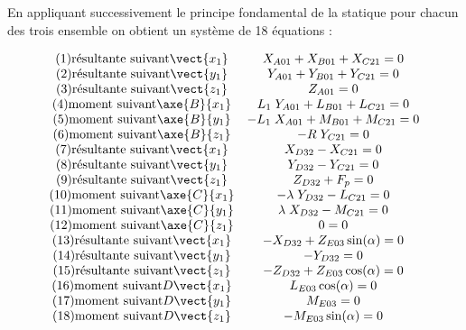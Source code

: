 En appliquant successivement le principe fondamental de la statique pour chacun des trois ensemble on obtient un système de 18 équations :

\begin{align*}
\begin{array}{c}
(1) \mbox{résultante suivant} \vect{x_1} \\ 
(2) \mbox{résultante suivant} \vect{y_1} \\ 
(3) \mbox{résultante suivant} \vect{z_1} \\ 
(4) \mbox{moment suivant} \axe{B}{{x_1}} \\ 
(5) \mbox{moment suivant} \axe{B}{{y_1}} \\ 
(6) \mbox{moment suivant} \axe{B}{{z_1}} \\ 
(7) \mbox{résultante suivant} \vect{x_1} \\ 
(8) \mbox{résultante suivant} \vect{y_1} \\ 
(9) \mbox{résultante suivant} \vect{z_1} \\ 
(10) \mbox{moment suivant} \axe{C}{{x_1}} \\ 
(11) \mbox{moment suivant} \axe{C}{{y_1}} \\ 
(12) \mbox{moment suivant} \axe{C}{{z_1}} \\ 
(13) \mbox{résultante suivant} \vect{x_1} \\ 
(14) \mbox{résultante suivant} \vect{y_1} \\ 
(15) \mbox{résultante suivant} \vect{z_1} \\ 
(16) \mbox{moment suivant} {D}{\vect{x_1}} \\ 
(17) \mbox{moment suivant} {D}{\vect{y_1}} \\ 
(18) \mbox{moment suivant} {D}{\vect{z_1}} \\ 
\end{array}
\begin{array}{c}
X_{A01}+X_{B01}+X_{C21}=0 \\
Y_{A01}+Y_{B01}+Y_{C21}=0 \\ 
Z_{A01}=0 \\ 
L_1\;Y_{A01}+L_{B01}+L_{C21}=0 \\ 
-L_1\;X_{A01}+M_{B01}+M_{C21}=0 \\  
-R\;Y_{C21} =0\\
X_{D32}-X_{C21}=0 \\ 
Y_{D32}-Y_{C21}=0 \\  
Z_{D32}+F_p=0 \\ 
-\lambda\;Y_{D32}-L_{C21}=0 \\ 
\lambda\;X_{D32}-M_{C21}=0 \\ 
0 =0\\
-X_{D32}+Z_{E03}\sin(\alpha)=0 \\ 
-Y_{D32}=0 \\ 
-Z_{D32}+Z_{E03}\cos(\alpha)=0 \\ 
L_{E03}\cos(\alpha)=0 \\ 
M_{E03}=0\\ 
-M_{E03}\sin(\alpha)=0\\ 
\end{array}%
\end{align*}


